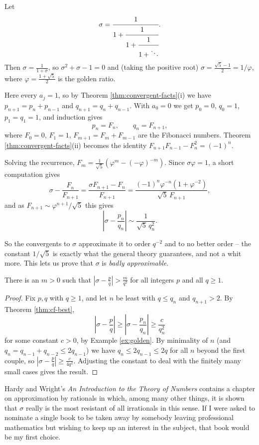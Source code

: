 \documentclass[a4paper]{scrartcl}
\begin{document}
\begin{example}\label{ex:golden}
	Let
	$$\sigma = \cfrac1{1+\cfrac1{1+\cfrac1{1+\ddots}}}.$$
	Then $\sigma = \frac{1}{1+\sigma}$, so $\sigma^2+\sigma-1 = 0$ and (taking the positive root) $\sigma = \frac{\sqrt5-1}{2} = 1/\varphi$, where $\varphi = \frac{1+\sqrt5}{2}$ is the golden ratio.

	Here every $a_j = 1$, so by Theorem \ref{thm:convergent-facts}(i) we have $p_{n+1}=p_n+p_{n-1}$ and $q_{n+1}=q_n+q_{n-1}$. With $a_0=0$ we get $p_0 = 0$, $q_0 = 1$, $p_1 = q_1 = 1$, and induction gives
	$$p_n = F_n, \qquad q_n = F_{n+1},$$
	where $F_0=0$, $F_1 = 1$, $F_{m+1}=F_m+F_{m-1}$ are the Fibonacci numbers. Theorem \ref{thm:convergent-facts}(ii) becomes the identity $F_{n+1}F_{n-1}-F_n^2 = (-1)^n$.

	Solving the recurrence, $F_m = \frac{1}{\sqrt5}\left(\varphi^m - (-\varphi)^{-m}\right)$. Since $\sigma\varphi = 1$, a short computation gives
	$$\sigma - \frac{F_n}{F_{n+1}} = \frac{\sigma F_{n+1}-F_n}{F_{n+1}} = \frac{(-1)^n\varphi^{-n}(1+\varphi^{-2})}{\sqrt5\,F_{n+1}},$$
	and as $F_{n+1}\sim\varphi^{n+1}/\sqrt5$ this gives
	$$\left|\sigma-\frac{p_n}{q_n}\right|\sim\frac{1}{\sqrt5\,q_n^2}.$$
\end{example}

So the convergents to $\sigma$ approximate it to order $q^{-2}$ and to no better order -- the constant $1/\sqrt5$ is exactly what the general theory guarantees, and not a whit more. This lets us prove that $\sigma$ is \emph{badly approximable}.

\begin{proposition}
	There is an $m>0$ such that $\left|\sigma-\frac pq\right| > \frac{m}{q^2}$ for all integers $p$ and all $q\geq1$.
\end{proposition}

\begin{proof}
	Fix $p,q$ with $q\geq1$, and let $n$ be least with $q\leq q_n$ and $q_{n+1}>2$. By Theorem \ref{thm:cf-best},
	$$\left|\sigma-\frac pq\right|\geq\left|\sigma-\frac{p_n}{q_n}\right|\geq\frac{c}{q_n^2}$$
	for some constant $c>0$, by Example \ref{ex:golden}. By minimality of $n$ (and $q_{n} = q_{n-1}+q_{n-2}\leq 2q_{n-1}$) we have $q_n \leq 2q_{n-1}\leq 2q$ for all $n$ beyond the first couple, so $\left|\sigma-\frac pq\right|\geq \frac{c}{4q^2}$. Adjusting the constant to deal with the finitely many small cases gives the result.
\end{proof}

Hardy and Wright's \emph{An Introduction to the Theory of Numbers} contains a chapter on approximation by rationals in which, among many other things, it is shown that $\sigma$ really is the most resistant of all irrationals in this sense. If I were asked to nominate a single book to be taken away by somebody leaving professional mathematics but wishing to keep up an interest in the subject, that book would be my first choice.
\end{document}
